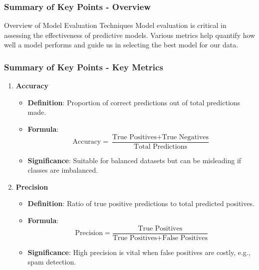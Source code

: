 \documentclass[aspectratio=169]{beamer}
\begin{document}
\begin{frame}[fragile]
    \frametitle{Summary of Key Points - Overview}
    \begin{block}{Overview of Model Evaluation Techniques}
        Model evaluation is critical in assessing the effectiveness of predictive models. 
        Various metrics help quantify how well a model performs and guide us in selecting the best model for our data.
    \end{block}
\end{frame}

\begin{frame}[fragile]
    \frametitle{Summary of Key Points - Key Metrics}
    \begin{enumerate}
        \item \textbf{Accuracy}
        \begin{itemize}
            \item \textbf{Definition}: Proportion of correct predictions out of total predictions made.
            \item \textbf{Formula}: 
            \begin{equation}
            \text{Accuracy} = \frac{\text{True Positives} + \text{True Negatives}}{\text{Total Predictions}}
            \end{equation}
            \item \textbf{Significance}: Suitable for balanced datasets but can be misleading if classes are imbalanced.
        \end{itemize}
        
        \item \textbf{Precision}
        \begin{itemize}
            \item \textbf{Definition}: Ratio of true positive predictions to total predicted positives.
            \item \textbf{Formula}: 
            \begin{equation}
            \text{Precision} = \frac{\text{True Positives}}{\text{True Positives} + \text{False Positives}}
            \end{equation}
            \item \textbf{Significance}: High precision is vital when false positives are costly, e.g., spam detection.
        \end{itemize}


\end{enumerate}
\end{frame}
\end{document}
